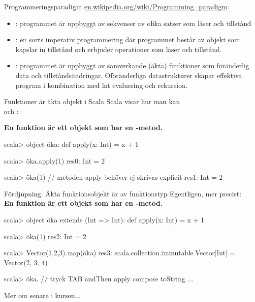 
\begin{Slide}{Programmeringsparadigm}
\href{https://en.wikipedia.org/wiki/Programming_paradigm}{en.wikipedia.org/wiki/Programming\_paradigm}:
\begin{itemize}
\item {}: programmet är uppbyggt av sekvenser av olika satser som läser och  tillstånd
\item {}: en sorts imperativ programmering där programmet består av objekt som kapslar in tillstånd och erbjuder operationer som läser och  tillstånd.
\item {}: programmet är uppbyggt av samverkande (äkta) funktioner som  föränderlig data och tillståndsändringar. Oföränderliga datastrukturer skapar effektiva program i kombination med lat evaluering och rekursion.
\end{itemize}
\end{Slide}


\begin{Slide}{Funktioner är äkta objekt i Scala}
Scala visar hur man kan   \\  och : \\\vspace{0.5em}

\textbf{En funktion är ett objekt som har en -metod.}
\pause
\begin{REPLnonum}
scala> object öka:
         def apply(x: Int) = x + 1

scala> öka.apply(1)
res0: Int = 2

scala> öka(1)   // metoden apply behöver ej skrivas explicit
res1: Int = 2
\end{REPLnonum}
\end{Slide}



\begin{Slide}{Fördjupning: Äkta funktionsobjekt är av funktionstyp}
Egentligen, mer precist:\\
\textbf{En funktion är ett objekt  som har en -metod.}
\pause
\begin{REPLnonum}
scala> object öka extends (Int => Int):
         def apply(x: Int) = x + 1
 
scala> öka(1)
res2: Int = 2

scala> Vector(1,2,3).map(öka)
res3: scala.collection.immutable.Vector[Int] = Vector(2, 3, 4)

scala> öka.   // tryck TAB
andThen   apply   compose   toString  ...
\end{REPLnonum}
Mer om  senare i kursen... %
\end{Slide}




